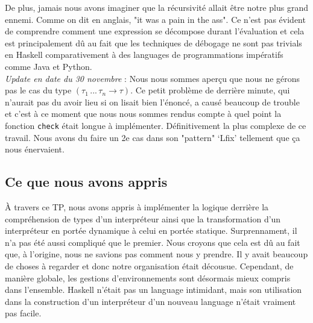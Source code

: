 \documentclass[a4paper,12pt]{article}
\begin{document}
        De plus, jamais nous avons imaginer que la récursivité allait être notre
        plus grand ennemi. Comme on dit en anglais, "it was a pain in the ass". Ce
        n'est pas évident de comprendre comment une expression se décompose durant
        l'évaluation et cela est principalement dû au fait que les techniques de 
        débogage ne sont pas trivials en Haskell comparativement à des languages
        de programmations impératifs comme Java et Python. \\

        \textit{Update en date du 30 novembre} : Nous nous sommes aperçu que 
        nous ne gérons pas le cas du type $(\tau_1\, ...\, \tau_n \rightarrow \tau)$.
        Ce petit problème de derrière minute, qui n'aurait pas du avoir lieu si on 
        lisait bien l'énoncé, a causé beaucoup de trouble et c'est à ce moment que 
        nous nous sommes rendus compte à quel point la fonction \texttt{check} 
        était longue à implémenter. Définitivement la plus complexe de ce travail. 
        Nous avons du faire un 2e cas dans son "pattern" `Lfix' tellement que ça 
        nous énervaient.
    \subsection{Ce que nous avons appris}
        À travers ce TP, nous avons appris à implémenter la logique derrière 
        la compréhension de types d'un interpréteur ainsi que la transformation
        d'un interpréteur en portée dynamique à celui en portée statique. 
        Surprennament, il n'a pas été aussi compliqué que le premier. Nous croyons
        que cela est dû au fait que, à l'origine, nous ne savions pas comment nous
        y prendre. Il y avait beaucoup de choses à regarder et donc notre 
        organisation était décousue. Cependant, de manière globale, les gestions 
        d'environnements sont désormais mieux compris dans l'ensemble. Haskell 
        n'était pas un language intimidant, mais son utilisation dans la construction
        d'un interpréteur d'un nouveau language n'était vraiment pas facile.
\end{document}
